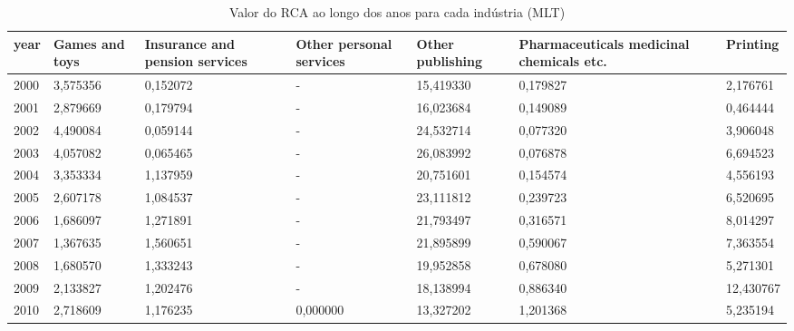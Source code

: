 \begin{table}
\centering
\caption{Valor do RCA ao longo dos anos para cada indústria (MLT)}
\begin{tabular}{p{1cm}p{2cm}p{2cm}p{2cm}p{2cm}p{2cm}p{2cm}}
\toprule
 year &  Games and toys &  Insurance and pension services &  Other personal services &  Other publishing &  Pharmaceuticals medicinal chemicals etc. &  Printing \\
\midrule
 2000 &        3,575356 &                        0,152072 &                        - &         15,419330 &                                  0,179827 &  2,176761 \\
 2001 &        2,879669 &                        0,179794 &                        - &         16,023684 &                                  0,149089 &  0,464444 \\
 2002 &        4,490084 &                        0,059144 &                        - &         24,532714 &                                  0,077320 &  3,906048 \\
 2003 &        4,057082 &                        0,065465 &                        - &         26,083992 &                                  0,076878 &  6,694523 \\
 2004 &        3,353334 &                        1,137959 &                        - &         20,751601 &                                  0,154574 &  4,556193 \\
 2005 &        2,607178 &                        1,084537 &                        - &         23,111812 &                                  0,239723 &  6,520695 \\
 2006 &        1,686097 &                        1,271891 &                        - &         21,793497 &                                  0,316571 &  8,014297 \\
 2007 &        1,367635 &                        1,560651 &                        - &         21,895899 &                                  0,590067 &  7,363554 \\
 2008 &        1,680570 &                        1,333243 &                        - &         19,952858 &                                  0,678080 &  5,271301 \\
 2009 &        2,133827 &                        1,202476 &                        - &         18,138994 &                                  0,886340 & 12,430767 \\
 2010 &        2,718609 &                        1,176235 &                 0,000000 &         13,327202 &                                  1,201368 &  5,235194 \\

\end{tabular}
\end{table}
